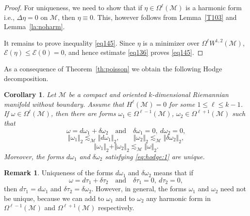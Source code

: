 \documentclass[intlimits,12pt,reqno]{amsart}
\newcommand{\cM}{\mathcal M}
\numberwithin{equation}{section}
\newtheorem{corollary}[theorem]{Corollary}
\theoremstyle{definition}
\newtheorem{remark}[theorem]{Remark}
\newcommand{\lap}{\Delta}
\begin{document}
\begin{proof}
For uniqueness, we need to show that if $\eta \in\Omega^\ell (\cM)$ is a harmonic form i.e., $\lap\eta=0$ on $\cM$, then $\eta \equiv 0$. This, however follows from Lemma~\ref{T103} and Lemma~\ref{la:noharm}. 

It remains to prove inequality \eqref{eq145}. Since $\eta$ is a minimizer over $\Omega^\ell W^{1,2}(\cM)$, $\mathcal{E}(\eta)\leq\mathcal{E}(0)=0$, and hence estimate \eqref{eq136} proves \eqref{eq145}.
\end{proof}



As a consequence of Theorem~\ref{th:poisson} we obtain the following Hodge decomposition. 
\begin{corollary}
\label{th:hodge}
Let $\cM$ be a compact and oriented $k$-dimensional Riemannian manifold without boundary. 
Assume that $H^\ell(\cM)=0$ for some $1\leq \ell\leq k-1$.
If $\omega \in\Omega^\ell(\cM)$, then there are forms $\omega_1 \in \Omega^{\ell-1}(\cM)$, $\omega_2 \in \Omega^{\ell+1}(\cM)$ such that 
\begin{equation}
\label{eq:hodge:1}
\omega = d\omega_1 + \delta \omega_2 
\quad 
\text{and}
\quad
\delta \omega_1 = 0, \
d\omega_2 = 0,
\end{equation}
\begin{equation}
\label{eq156}
\Vert\omega_1\Vert_2\lesssim_\cM \Vert d\omega_1\Vert_2,
\qquad
\Vert\omega_2\Vert_2\lesssim_\cM \Vert \delta\omega_2\Vert_2,
\end{equation}
\begin{equation}
\label{eq138}
\Vert\omega_1\Vert_2+\Vert\omega_2\Vert_2\lesssim_\cM \Vert\omega\Vert_2.
\end{equation}
Moreover, the forms $d\omega_1$ and $\delta\omega_2$ satisfying \eqref{eq:hodge:1} are unique.
\end{corollary}
\begin{remark}
Uniqueness of the forms $d\omega_1$ and $\delta\omega_2$ means that if
$$
\omega = d\tau_1 + \delta \tau_2 
\quad 
\text{and}
\quad
\delta \tau_1 = 0, \
d\tau_2 = 0,
$$
then $d\tau_1=d\omega_1$ and $\delta\tau_2=\delta\omega_2$. However, in general, the forms $\omega_1$ and $\omega_2$ need not be unique, because we can add to $\omega_1$ and to $\omega_2$ any harmonic form in $\Omega^{\ell-1}(\cM)$ and $\Omega^{\ell+1}(\cM)$ respectively.
\end{remark}
\end{document}
